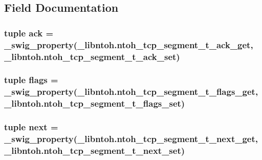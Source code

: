 \subsection{Field Documentation}
\hypertarget{classlibntoh_1_1ntoh__tcp__segment__t_a0ccc7a1fc96dc8394903666fc5eb23eb}{
\subsubsection[{ack}]{\setlength{\rightskip}{0pt plus 5cm}tuple ack = {\bf \-\_\-swig\-\_\-property}(\-\_\-libntoh.\-ntoh\-\_\-tcp\-\_\-segment\-\_\-t\-\_\-ack\-\_\-get, \-\_\-libntoh.\-ntoh\-\_\-tcp\-\_\-segment\-\_\-t\-\_\-ack\-\_\-set)\hspace{0.3cm}{\ttfamily [static]}}}\label{classlibntoh_1_1ntoh__tcp__segment__t_a0ccc7a1fc96dc8394903666fc5eb23eb}
\hypertarget{classlibntoh_1_1ntoh__tcp__segment__t_a9ceb38153d5c0f156fbeada6dc00ff4f}{
\subsubsection[{flags}]{\setlength{\rightskip}{0pt plus 5cm}tuple flags = {\bf \-\_\-swig\-\_\-property}(\-\_\-libntoh.\-ntoh\-\_\-tcp\-\_\-segment\-\_\-t\-\_\-flags\-\_\-get, \-\_\-libntoh.\-ntoh\-\_\-tcp\-\_\-segment\-\_\-t\-\_\-flags\-\_\-set)\hspace{0.3cm}{\ttfamily [static]}}}\label{classlibntoh_1_1ntoh__tcp__segment__t_a9ceb38153d5c0f156fbeada6dc00ff4f}
\hypertarget{classlibntoh_1_1ntoh__tcp__segment__t_a84e6dac37062f5a539ece8248c8567cc}{
\subsubsection[{next}]{\setlength{\rightskip}{0pt plus 5cm}tuple next = {\bf \-\_\-swig\-\_\-property}(\-\_\-libntoh.\-ntoh\-\_\-tcp\-\_\-segment\-\_\-t\-\_\-next\-\_\-get, \-\_\-libntoh.\-ntoh\-\_\-tcp\-\_\-segment\-\_\-t\-\_\-next\-\_\-set)\hspace{0.3cm}{\ttfamily [static]}}}\label{classlibntoh_1_1ntoh__tcp__segment__t_a84e6dac37062f5a539ece8248c8567cc}

